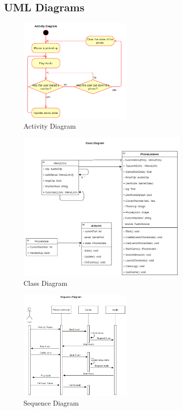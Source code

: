 \documentclass[12pt]{article}
\begin{document}
\FloatBarrier
\subsection{UML Diagrams}
\begin{figure}[h]
    \centering
    \includegraphics[width=0.5\textwidth]{ActivityDiagram}
    \caption{Activity Diagram}
\end{figure}

\begin{figure}[h]
    \centering
    \includegraphics[width=0.75\textwidth]{ClassDiagram}
    \caption{Class Diagram}
\end{figure}

\begin{figure}[h]
    \centering
    \includegraphics[width=0.5\textwidth]{SequenceDiagram}
    \caption{Sequence Diagram}
\end{figure}
\end{document}
